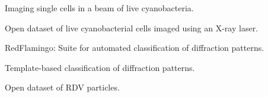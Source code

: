 \documentclass{UUThesisTemplate}
\begin{document}
\frontmatter
    \frontmatterCS 
 
   \dedication{Dedicated to our new Life: Emmanuel and Mathis}
 
    \begin{listofpapers}
    	\item Imaging single cells in a beam of live cyanobacteria. %
        \item Open dataset of live cyanobacterial cells imaged using an X-ray laser. %
        \item RedFlamingo: Suite for automated classification of diffraction patterns. %
        \item Template-based classification of diffraction patterns. %
        \item Open dataset of RDV particles. %
    \end{listofpapers}
    
\end{document}
